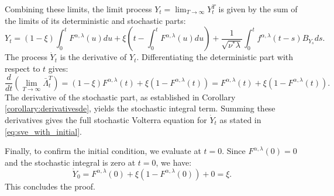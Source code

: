 \documentclass[letterpaper]{article}
\numberwithin{equation}{section}
\theoremstyle{definition}
\theoremstyle{remark}
\begin{document}
Combining these limits, the limit process $Y_t = \lim_{T\to\infty} Y_t^T$ is given by the sum of the limits of its deterministic and stochastic parts:
\[
Y_t = (1-\xi)\int_0^t F^{\alpha,\lambda}(u)du + \xi \left( t - \int_0^t F^{\alpha,\lambda}(u)du \right) + \frac{1}{\sqrt{\nu^* \lambda}} \int_0^t f^{\alpha,\lambda}(t-s) B_{Y_s} ds.
\]
The process $\dot{Y}_t$ is the derivative of $Y_t$. Differentiating the deterministic part with respect to $t$ gives:
\[
\frac{d}{dt} \left( \lim_{T\to\infty} \bar{\Lambda}_t^T \right) = (1-\xi)F^{\alpha,\lambda}(t) + \xi\left(1 - F^{\alpha,\lambda}(t)\right) = F^{\alpha,\lambda}(t) + \xi\left(1 - F^{\alpha,\lambda}(t)\right).
\]
The derivative of the stochastic part, as established in Corollary \ref{corollary:derivativesde}, yields the stochastic integral term. Summing these derivatives gives the full stochastic Volterra equation for $\dot{Y}_t$ as stated in \eqref{eq:sve_with_initial}.

Finally, to confirm the initial condition, we evaluate at $t=0$. Since $F^{\alpha,\lambda}(0)=0$ and the stochastic integral is zero at $t=0$, we have:
\[
\dot{Y}_0 = F^{\alpha,\lambda}(0) + \xi\left(1 - F^{\alpha,\lambda}(0)\right) + 0 = \xi.
\]
This concludes the proof.
\end{document}
